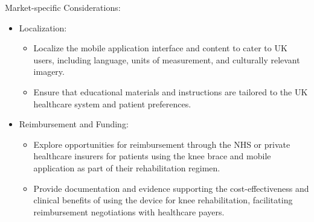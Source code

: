 \documentclass[main.tex]{subfiles}
\begin{document}
Market-specific Considerations:
\begin{itemize}
	\item Localization:
	      \begin{itemize}
		      \item Localize the mobile application interface and content to cater to UK users, including language, units of measurement, and culturally relevant imagery.
		      \item Ensure that educational materials and instructions are tailored to the UK healthcare system and patient preferences.
	      \end{itemize}
	\item Reimbursement and Funding:
	      \begin{itemize}
		      \item Explore opportunities for reimbursement through the NHS or private healthcare insurers for patients using the knee brace and mobile application as part of their rehabilitation regimen.
		      \item Provide documentation and evidence supporting the cost-effectiveness and clinical benefits of using the device for knee rehabilitation, facilitating reimbursement negotiations with healthcare payers.
	      \end{itemize}
\end{itemize}


\ifSubfilesClassLoaded{%
	\printbibliography{}
}{}
\end{document}
